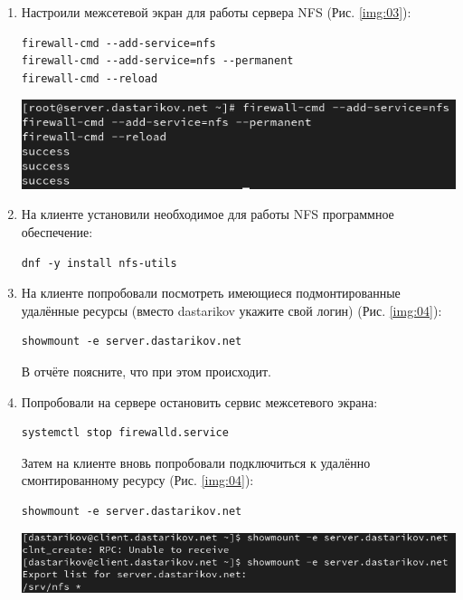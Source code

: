 \begin{enumerate}
\item Настроили межсетевой экран для работы сервера NFS (Рис. \ref{img:03}):
    \begin{verbatim}
firewall-cmd --add-service=nfs
firewall-cmd --add-service=nfs --permanent
firewall-cmd --reload
    \end{verbatim}

\begin{center}
    \centering
    \includegraphics[width=\textwidth]{../images/image03.png}
    \label{img:03}
\end{center}

\item На клиенте установили необходимое для работы NFS программное обеспечение:
    \begin{verbatim}
dnf -y install nfs-utils
    \end{verbatim}
\item На клиенте попробовали посмотреть имеющиеся подмонтированные удалённые
ресурсы (вместо dastarikov укажите свой логин) (Рис. \ref{img:04}):
    \begin{verbatim}
showmount -e server.dastarikov.net
    \end{verbatim}
В отчёте поясните, что при этом происходит.
\item Попробовали на сервере остановить сервис межсетевого экрана:
    \begin{verbatim}
systemctl stop firewalld.service
    \end{verbatim}
Затем на клиенте вновь попробовали подключиться к удалённо смонтированному ресурсу (Рис. \ref{img:04}):
    \begin{verbatim}
showmount -e server.dastarikov.net
    \end{verbatim}

\begin{center}
    \centering
    \includegraphics[width=\textwidth]{../images/image04.png}
    \label{img:04}
\end{center}


\end{enumerate}
